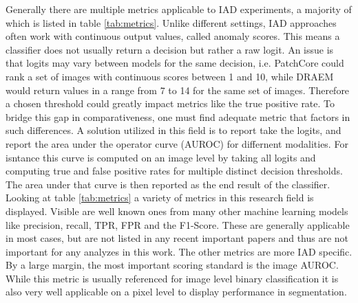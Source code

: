 Generally there are multiple metrics applicable to IAD experiments, a majority of which is listed in table \ref{tab:metrics}. Unlike different 
settings, IAD approaches often work with continuous output values, called anomaly scores. This means a classifier does not usually return 
a decision but rather a raw logit. An issue is that logits may vary between models for the same decision, i.e. PatchCore \cite{patchCore2022} could rank a set of images 
with continuous scores between 1 and 10, while DRAEM \cite{Zavrtanik_2021DRAEM} would return values in a range from 7 to 14 for the same 
set of images. Therefore a chosen threshold could greatly impact metrics like the true positive rate. To bridge this gap in comparativeness, one must find adequate metric that factors in such differences.
A solution utilized in this field is to report take the logits, and report the area under the operator curve (AUROC) for differnent modalities. 
For isntance this curve is computed on an image level by taking all logits and computing true and false positive rates for multiple distinct 
decision thresholds. The area under that curve is then reported as the end result of the classifier.
\newline\newline
Looking at table \ref{tab:metrics} a variety of metrics in this research field is displayed. Visible are well known 
ones from many other machine learning models like precision, recall, TPR, FPR and the F1-Score. These are generally applicable in most 
cases, but are not listed in any recent important papers and thus are not important for any analyzes in this work. The other metrics are 
more IAD specific. By a large margin, the most important scoring standard is the image AUROC. While this metric is usually referenced for image level 
binary classification it is also very well applicable on a pixel level to display performance in segmentation. 



